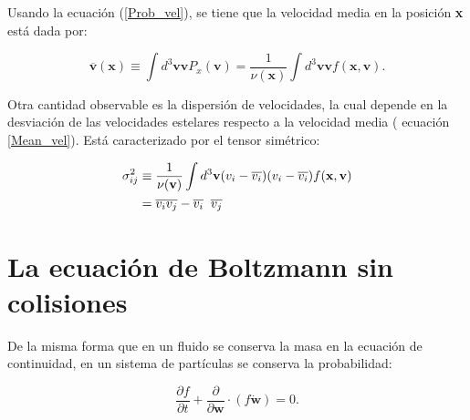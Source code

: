 



Usando la ecuación (\ref{Prob_vel}), se tiene que la velocidad media en la posición \textbf{x} está dada por:

\begin{equation}
\label{Mean_vel}
\overline{\textbf{v}} (\textbf{x}) \equiv \int d^3\textbf{v} \textbf{v} P_x(\textbf{v}) = \frac{1}{\nu(\textbf{x}) } \int d^3\textbf{v} \textbf{v} f(\textbf{x}, \textbf{v}).
\end{equation}

Otra cantidad observable es la dispersión de velocidades, la cual depende en la desviación de las velocidades estelares respecto a la velocidad media ( ecuación \ref{Mean_vel}). Está caracterizado por el tensor simétrico:

\begin{align}
\sigma_{ij}^2 & \equiv \frac{1}{ \nu( \textbf{v} ) }  \int d^3\textbf{v} ( v_i - \overline{v_i} ) ( v_i - \overline{v_i} )  f(\textbf{x}, \textbf{v}) \\
\label{Tens_disp_vel}
& = \overline{v_i v_j} - \overline{v_i} \hspace{2mm} \overline{v_j}
\end{align}

\section{La ecuación de Boltzmann sin colisiones}


De la misma forma que en un fluido se conserva la masa en la ecuación de continuidad, en un sistema de partículas se conserva la probabilidad:

\begin{equation}
\label{cons_probab}
\frac{\partial f}{\partial t} + \frac{\partial }{\partial \textbf{w}} \cdot (f \dot{\textbf{w}} ) = 0.
\end{equation}

